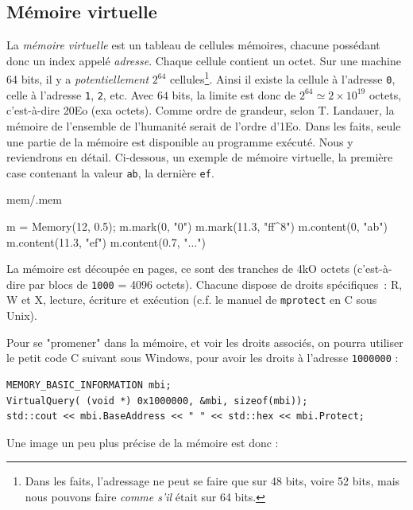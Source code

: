 \documentclass{book}
\newcounter{Qcours}
\newenvironment{memory}{%
	\noindent
	\VerbatimEnvironment\stepcounter{Qcours}%
	\begin{VerbatimOut}{mem/\theQcours.mem}%
	}{\end{VerbatimOut}%
}
\newcommand{\C}{\textsc{C}\xspace}
\newcommand{\code}[1]{\texttt{#1}}
\newcommand{\hexa}[1]{{\tt #1}}
\begin{document}

\subsection{Mémoire virtuelle}

La \emph{mémoire virtuelle} est un tableau de cellules mémoires, chacune possédant donc un index appelé \emph{adresse}. Chaque cellule contient un octet. Sur une machine 64 bits, il y a \emph{potentiellement} $2^{64}$ cellules\footnote{Dans les faits,  l'adressage ne peut se faire que sur 48 bits, voire 52 bits, mais nous pouvons faire \emph{comme s'il} était sur 64 bits.}. Ainsi il existe la cellule à l'adresse \code{0}, celle à l'adresse \code{1}, \code{2}, etc. Avec $64$ bits, la limite est donc de $2^{64} \simeq 2 \times 10^{19}$ octets, c'est-à-dire 20Eo (exa octets). Comme ordre de grandeur, selon T. Landauer, la mémoire de l'ensemble de l'humanité serait de l'ordre d'1Eo. Dans les faits, seule une partie de la mémoire est disponible au programme exécuté. Nous y reviendrons en détail.  Ci-dessous, un exemple de mémoire virtuelle, la première case contenant la valeur \hexa{ab}, la dernière \hexa{ef}. 

\medskip
\begin{memory}
m = Memory(12, 0.5);
m.mark(0, "0")
m.mark(11.3, "ff\^ {}8")
m.content(0, "ab")
m.content(11.3, "ef")
m.content(0.7, "$\ldots$")
\end{memory}

La mémoire est découpée en pages, ce sont des tranches de 4kO octets (c'est-à-dire par blocs de \hexa{1000} = 4096 octets). Chacune dispose de droits spécifiques~: R, W et X, lecture, écriture et exécution (c.f. le manuel de {\tt mprotect} en \C sous Unix). 

Pour se "promener" dans la mémoire, et voir les droits associés, on pourra utiliser le petit code \C suivant sous Windows, pour avoir les droits à l'adresse \hexa{1000000} :
\begin{verbatim}
MEMORY_BASIC_INFORMATION mbi;
VirtualQuery( (void *) 0x1000000, &mbi, sizeof(mbi));
std::cout << mbi.BaseAddress << " " << std::hex << mbi.Protect;
\end{verbatim}

Une image un peu plus précise de la mémoire est donc :
\end{document}
